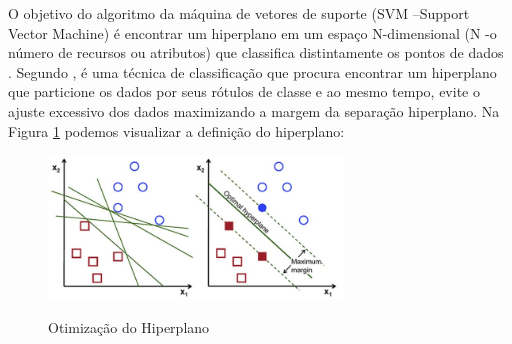 \documentclass[12pt,oneside,a4paper,chapter=TITLE,
			   english,brazil]{abntex2}
\begin{document}
O  objetivo  do  algoritmo  da  máquina  de  vetores  de  suporte  (SVM –Support Vector Machine) é encontrar um hiperplano em um espaço N-dimensional (N -o número de recursos ou atributos) que classifica distintamente os pontos de dados \cite{datascienceacademy}. Segundo  , é uma técnica de classificação que procura encontrar um hiperplano que particione os dados por seus rótulos de classe e ao mesmo tempo, evite o ajuste excessivo dos dados maximizando a margem da separação
hiperplano.  Na Figura \ref{fig:imagem1} podemos visualizar a definição do hiperplano:



\begin{figure}[H]
  \centering
    \caption[Otimização do Hiperplano]{Otimização do Hiperplano}
  \includegraphics[width=0.7\textwidth]{whatsap_SVM.jpeg}
  \label{fig:imagem1}
\end{figure}
\begin{flushleft}
\vspace{-1.5em}
\centering
{}
\end{flushleft}



\end{document}
